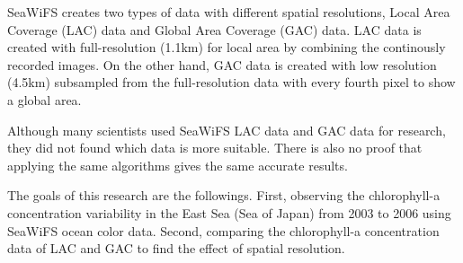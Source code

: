 SeaWiFS creates two types of data with different spatial resolutions, Local Area Coverage (LAC) data and Global Area Coverage (GAC) data. LAC data is created with full-resolution (1.1km) for local area by combining the continously recorded images. On the other hand, GAC data is created with low resolution (4.5km) subsampled from the full-resolution data with every fourth pixel to show a global area. 

Although many scientists used SeaWiFS LAC data and GAC data for research, they did not found which data is more suitable. There is also no proof that applying the same algorithms gives the same accurate results. 

The goals of this research are the followings. First, observing the chlorophyll-a concentration variability in the East Sea (Sea of Japan) from 2003 to 2006 using SeaWiFS ocean color data. Second, comparing the chlorophyll-a concentration data of LAC and GAC to find the effect of spatial resolution.

